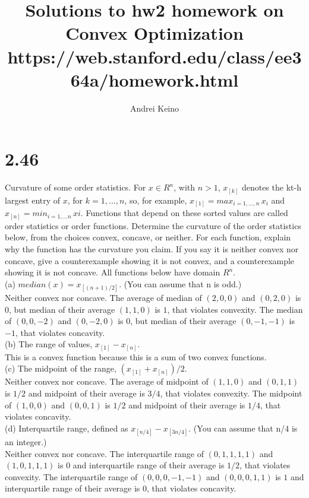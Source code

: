 \documentclass{article}
\begin{document}
\title{Solutions to hw2 homework on Convex Optimization https://web.stanford.edu/class/ee364a/homework.html}
\author{Andrei Keino}
\maketitle
\section*{2.46}

Curvature of some order statistics. For $x \in R^n$, with $n > 1$, $x_{[k]} $ denotes the kt-h largest entry
of $x$, for $k = 1,...,n$, so, for example, $x_{[1]} = max_{i=1,...,n} \, x_i$ and $x_{[n]} = min_{i=1,...n} \, xi$. Functions
that depend on these sorted values are called order statistics or order functions. Determine the
curvature of the order statistics below, from the choices convex, concave, or neither. For each
function, explain why the function has the curvature you claim. If you say it is neither convex nor
concave, give a counterexample showing it is not convex, and a counterexample showing it is not
concave. All functions below have domain $R^n$. \\

(a) $median(x) = x_{[(n+1)/{2}]}$. (You can assume that n is odd.)
\\ Neither convex nor concave. The average of median of $(2, 0, 0)$ and $(0, 2, 0)$ is $0$, but median of their average $(1, 1, 0)$ is $1$, that violates convexity. The median of $(0, 0, -2)$ and $(0, -2, 0)$ is $0$, but median of their average $(0, - 1, -1)$ is $-1$, that violates concavity.\\

(b) The range of values, $x_{[1]} - x_{[n]}$. \\
This is a convex function because this is a sum of two convex functions.\\

(c) The midpoint of the range, $(x_{[1]} + x_{[n]}) / 2$.\\
Neither convex nor concave. The average of midpoint of $(1, 1, 0)$ and $(0, 1, 1)$ is $1/2$ and midpoint of their average is $3/4$, that violates convexity. The midpoint of $(1, 0, 0)$ and $(0, 0, 1)$ is $1/2$ and midpoint of their average is $1/4$, that violates concavity.\\

(d) Interquartile range, defined as $x_{[n/4]} - x_{[3n/4]}$. (You can assume that n/4 is an integer.) \\
Neither convex nor concave. The interquartile range of 
$(0, 1, 1, 1, 1)$ and $(1, 0, 1, 1, 1)$ is $0$ and interquartile range of their average is $1/2$, that violates convexity. The interquartile range of $(0, 0, 0, -1, -1)$ and $(0, 0, 0, 1, 1)$ is $1$ and interquartile range of their average is $0$, that violates concavity.
\end{document}
